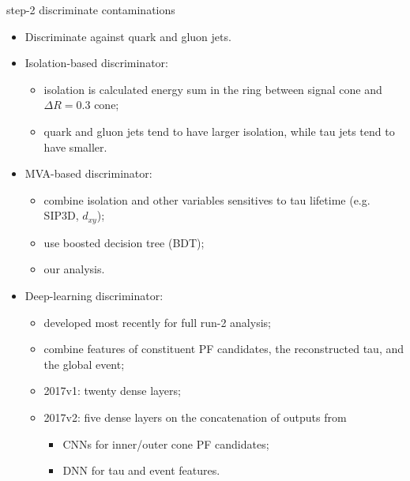 \begin{frame}{}
\smaller
    
    \begin{columns}[c]
        \begin{block}{step-2 discriminate contaminations}
        \begin{itemize} 
            \item Discriminate against quark and gluon jets.
            \item Isolation-based discriminator: 
            \begin{itemize} 
            \smaller
                \item isolation is calculated energy sum in the ring between signal cone and $\Delta R = 0.3$ cone;
                \item quark and gluon jets tend to have larger isolation, while tau jets tend to have smaller.
            \end{itemize}
        
             
            
            \item MVA-based discriminator: 
            \begin{itemize} 
            \smaller
                \item combine isolation and other variables sensitives to tau lifetime (e.g. SIP3D, $d_{xy}$);
                \item use boosted decision tree (BDT);
                \item our analysis.
            \end{itemize}
            
            \item Deep-learning discriminator:
            \begin{itemize} 
            \smaller
                \item developed most recently for full run-2 analysis;
                \item combine features of constituent PF candidates, the reconstructed tau, and the global event;
                \item 2017v1: twenty dense layers;
                \item 2017v2: five dense layers on the concatenation of outputs from 
                \begin{itemize} 
                \smaller
                    \item CNNs for inner/outer cone PF candidates;
                    \item DNN for tau and event features.
                \end{itemize}
            \end{itemize}
                        

\end{itemize}
\end{block}
\end{columns}
\end{frame}
